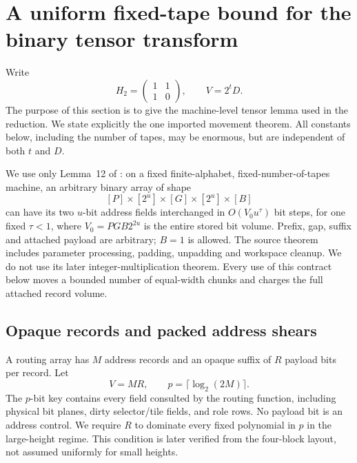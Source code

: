 \section{A uniform fixed-tape bound for the binary tensor transform}\label{sec:tensor}

Write
\[
 H_2=\begin{pmatrix}1&1\\1&0\end{pmatrix},\qquad
 V=2^tD.
\]
The purpose of this section is to give the machine-level tensor lemma used in the reduction. We state explicitly the one imported movement theorem. All constants below, including the number of tapes, may be enormous, but are independent of both $t$ and $D$.

\begin{contract}\label{con:swap-tensor}
We use only Lemma~12 of \cite{OpenAI26}: on a fixed finite-alphabet, fixed-number-of-tapes machine, an arbitrary binary array of shape
\[
 [P]\times[2^u]\times[G]\times[2^u]\times[B]
\]
can have its two $u$-bit address fields interchanged in $O(V_0u^\tau)$ bit steps, for one fixed $\tau<1$, where $V_0=PGB2^{2u}$ is the entire stored bit volume. Prefix, gap, suffix and attached payload are arbitrary; $B=1$ is allowed. The source theorem includes parameter processing, padding, unpadding and workspace cleanup. We do not use its later integer-multiplication theorem. Every use of this contract below moves a bounded number of equal-width chunks and charges the full attached record volume.
\end{contract}

\subsection{Opaque records and packed address shears}

A routing array has $M$ address records and an opaque suffix of $R$ payload bits per record. Let
\[
 V=MR,\qquad p=\lceil\log_2(2M)\rceil.
\]
The $p$-bit key contains every field consulted by the routing function, including physical bit planes, dirty selector/tile fields, and role rows. No payload bit is an address control. We require $R$ to dominate every fixed polynomial in $p$ in the large-height regime. This condition is later verified from the four-block layout, not assumed uniformly for small heights.

